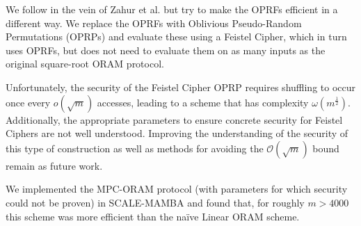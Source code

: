 We follow in the vein of Zahur et al. but try to make the OPRFs 
efficient in a different way.
We replace the OPRFs with Oblivious Pseudo-Random Permutations (OPRPs)
and evaluate these using a Feistel Cipher, which in turn
uses OPRFs, but does not need to evaluate them on as many 
inputs as the original square-root ORAM protocol.

Unfortunately, the security of the Feistel Cipher OPRP requires shuffling to occur
once every $o(\sqrt{m})$ accesses,
leading to a scheme that has complexity $\omega(m^{\frac{1}{2}})$.
Additionally, the appropriate parameters to ensure concrete security
for Feistel Ciphers are not well understood.
Improving the understanding of the security of this type of construction
as well as methods for avoiding the $\mathcal{O}(\sqrt{m})$ bound
remain as future work.

We implemented the MPC-ORAM protocol 
(with parameters for which security could not be proven)
in SCALE-MAMBA and found that, for roughly $m > 4000$ this 
scheme was more efficient than the na\"{i}ve Linear ORAM scheme.
